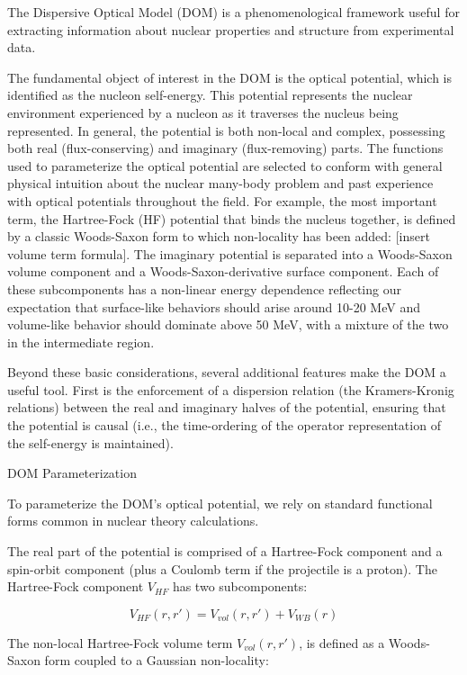 The Dispersive Optical Model (DOM) is a phenomenological framework useful for 
extracting information about nuclear properties and structure from experimental
data.

The fundamental object of interest in the DOM is the \Gls{optical potential},
which is identified as the \Gls{nucleon self-energy}. This potential represents
the nuclear environment experienced
by a nucleon as it traverses the nucleus being represented. In general, the
potential is both non-local and complex, possessing both real (flux-conserving)
and imaginary (flux-removing) parts. The functions used to parameterize the optical potential
are selected to conform with general physical intuition about the nuclear
many-body problem and past experience with optical potentials throughout the
field. For example, the most important term, the Hartree-Fock (HF) potential
that binds the nucleus together, is defined by a classic Woods-Saxon form to
which non-locality has been added: [insert volume term formula]. The imaginary
potential is separated into a Woods-Saxon volume component and a
Woods-Saxon-derivative surface component. Each of these subcomponents has
a non-linear energy dependence reflecting our expectation that surface-like
behaviors should arise around 10-20 MeV and volume-like behavior should dominate
above 50 MeV, with a mixture of the two in the intermediate region.

Beyond these basic considerations, several additional features make the 
DOM a useful tool. First is the enforcement of a
dispersion relation (the Kramers-Kronig relations) between the real and imaginary
halves of the potential, ensuring that the potential is causal (i.e., the
time-ordering of the operator representation of the self-energy is maintained).

DOM Parameterization

To parameterize the DOM's optical potential, we rely on standard functional
forms common in nuclear theory calculations.

The real part of the potential is comprised of a Hartree-Fock component and
a spin-orbit component (plus a Coulomb term if the projectile is a proton).
The Hartree-Fock component $V_{HF}$ has two subcomponents:

\begin{equation}
    V_{HF}(r,r') = V_{vol}(r,r') + V_{WB}(r)
\end{equation}

The non-local Hartree-Fock volume term $V_{vol}(r,r')$, is defined as
a Woods-Saxon form coupled to a Gaussian non-locality:

